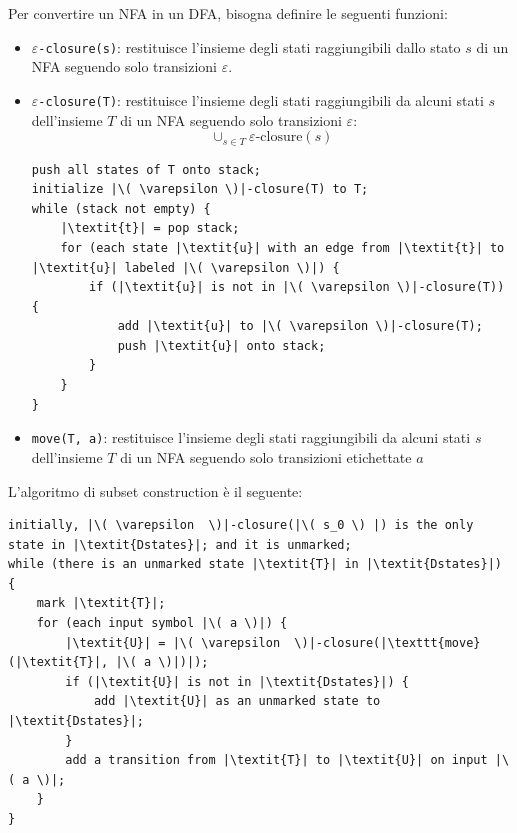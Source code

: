 \documentclass[a4paper]{article}
\begin{document}
Per convertire un NFA in un DFA, bisogna definire le seguenti funzioni:
\begin{itemize}
  \item \( \varepsilon \)\texttt{-closure(s)}: restituisce l'insieme degli stati
    raggiungibili dallo stato \( s \) di un NFA seguendo solo transizioni
    \( \varepsilon \).

  \item \( \varepsilon \)\texttt{-closure(T)}: restituisce l'insieme degli stati
    raggiungibili da alcuni stati \( s \) dell'insieme \( T \) di un NFA seguendo solo
    transizioni \( \varepsilon \):
    \[
      \cup_{s \in T} \varepsilon\text{-closure}(s)
    \] 
\begin{lstlisting}[escapechar=|, basicstyle=\rmfamily, columns=fullflexible, keepspaces=true]
push all states of T onto stack;
initialize |\( \varepsilon \)|-closure(T) to T;
while (stack not empty) {
    |\textit{t}| = pop stack;
    for (each state |\textit{u}| with an edge from |\textit{t}| to |\textit{u}| labeled |\( \varepsilon \)|) {
        if (|\textit{u}| is not in |\( \varepsilon \)|-closure(T)) {
            add |\textit{u}| to |\( \varepsilon \)|-closure(T);
            push |\textit{u}| onto stack;
        }
    }
}
\end{lstlisting}

  \item \texttt{move(T, a)}: restituisce l'insieme degli stati raggiungibili da alcuni
    stati \( s \) dell'insieme \( T \) di un NFA seguendo solo transizioni etichettate
    \( a \)
\end{itemize}
L'algoritmo di subset construction è il seguente:
\begin{lstlisting}[escapechar=|, basicstyle=\rmfamily, columns=fullflexible, keepspaces=true]
initially, |\( \varepsilon  \)|-closure(|\( s_0 \) |) is the only state in |\textit{Dstates}|; and it is unmarked;
while (there is an unmarked state |\textit{T}| in |\textit{Dstates}|) {
    mark |\textit{T}|;
    for (each input symbol |\( a \)|) {
        |\textit{U}| = |\( \varepsilon  \)|-closure(|\texttt{move}(|\textit{T}|, |\( a \)|)|);
        if (|\textit{U}| is not in |\textit{Dstates}|) {
            add |\textit{U}| as an unmarked state to |\textit{Dstates}|;
        }
        add a transition from |\textit{T}| to |\textit{U}| on input |\( a \)|;
    }
}
\end{lstlisting}
\end{document}
